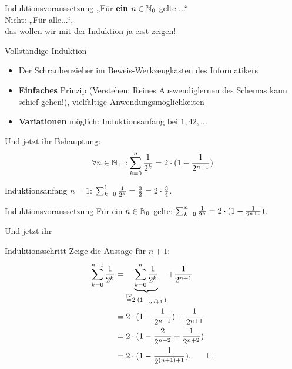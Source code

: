 \begin{frame}{Induktionsvoraussetzung}
	\Huge \centering
	\alert{
		„Für \textbf{ein} $n \in \mathbb{N}_0$ gelte ...“ \\
		\bigskip
		{ \LARGE
		Nicht: „Für alle...“,\\
		das wollen wir mit der Induktion ja erst zeigen!
		}
	}
\end{frame}

\begin{frame}[t]{Vollständige Induktion}
	\begin{itemize}
		\item Der Schraubenzieher im Beweis-Werkzeugkasten des Informatikers
		\item \textbf{Einfaches} Prinzip (Verstehen: Reines Auswendiglernen des Schemas kann schief gehen!), vielfältige Anwendungsmöglichkeiten
		\item \textbf{Variationen} möglich: Induktionsanfang bei $1, 42, ...$
	\end{itemize}
	
\end{frame}




\begin{frame}{Und jetzt ihr}
	Behauptung: \[\forall n \in \mathbb{N}_+ : \sum_{k=0}^{n}{\frac{1}{2^k}} = 2 \cdot (1 - \frac{1}{2^{n+1}})\]
	\begin{block}{Induktionsanfang}
		$n = 1$: $\sum_{k=0}^{1}{\frac{1}{2^k}} = \frac{3}{2} = 2 \cdot \frac{3}{4}$. \; \textbf{\checked}
	\end{block}
	\begin{block}{Induktionsvoraussetzung}
		Für ein $n \in \mathbb{N}_0$ gelte: $\sum_{k=0}^{n}{\frac{1}{2^k}} = 2 \cdot (1 - \frac{1}{2^{n+1}})$.
	\end{block}
\end{frame}

\begin{frame}{Und jetzt ihr}

	\begin{block}{Induktionsschritt}
		Zeige die Aussage für $n+1$:\\
		\begin{align*}
			\sum_{k=0}^{n+1}{\frac{1}{2^k}}
				&= \underbrace{\sum_{k=0}^{n}{\frac{1}{2^k}}}_{\stackrel{\text{IV}}{=} 2 \cdot (1 - \frac{1}{2^{n+1}})} + \frac{1}{2^{n+1}}\\
				&= 2 \cdot (1 - \frac{1}{2^{n+1}}) + \frac{1}{2^{n+1}}\\
				&= 2 \cdot (1 - \frac{2}{2^{n+2}} + \frac{1}{2^{n+2}})\\
				&= 2 \cdot (1 - \frac{1}{2^{(n+1)+1}}). \qed
		\end{align*}
	\end{block}
\end{frame}

